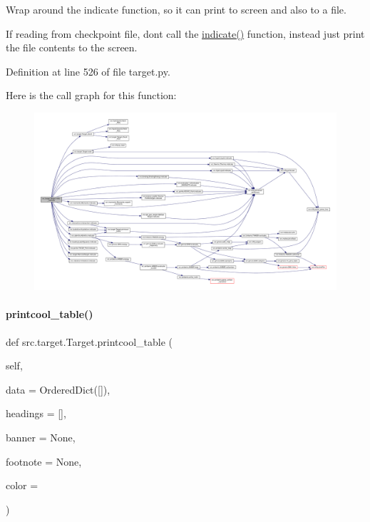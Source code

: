 Wrap around the indicate function, so it can print to screen and also to a file. 

If reading from checkpoint file, don\textquotesingle{}t call the \hyperlink{classsrc_1_1target_1_1RemoteTarget_abe88774b9f4627698672fb68e8caf057}{indicate()} function, instead just print the file contents to the screen. 

Definition at line 526 of file target.\+py.

Here is the call graph for this function\+:
\nopagebreak
\begin{figure}[H]
\begin{center}
\leavevmode
\includegraphics[width=350pt]{classsrc_1_1target_1_1Target_a75dc5c4428df625f265e481f61718ec1_cgraph}
\end{center}
\end{figure}
\mbox{\label{classsrc_1_1target_1_1Target_aa6d59de5918c58d75a9f23eb1c5bff39}} 
\paragraph{\texorpdfstring{printcool\+\_\+table()}{printcool\_table()}}
{\footnotesize\ttfamily def src.\+target.\+Target.\+printcool\+\_\+table (\begin{DoxyParamCaption}\item[{}]{self,  }\item[{}]{data = {\ttfamily OrderedDict(\mbox{[}\mbox{]})},  }\item[{}]{headings = {\ttfamily \mbox{[}\mbox{]}},  }\item[{}]{banner = {\ttfamily None},  }\item[{}]{footnote = {\ttfamily None},  }\item[{}]{color = {} }\end{DoxyParamCaption})\hspace{0.3cm}{\ttfamily [inherited]}}



